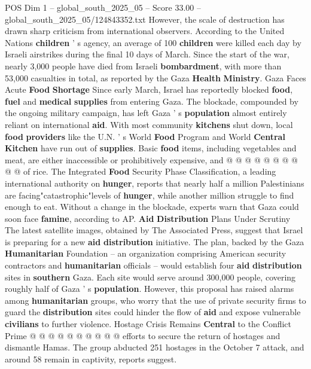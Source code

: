 \begin{textsample}{POS Dim 1 – global\_south\_2025\_05 – Score 33.00 – global\_south\_2025\_05/124843352.txt}
However, the scale of destruction has drawn sharp criticism from international observers.
According to the United Nations \textbf{children} ' s agency, an average of 100 \textbf{children} were killed each day by Israeli airstrikes during the final 10 days of March.
Since the start of the war, nearly 3,000 people have died from Israeli \textbf{bombardment}, with more than 53,000 casualties in total, as reported by the Gaza \textbf{Health} \textbf{Ministry}.
Gaza Faces Acute \textbf{Food} \textbf{Shortage} Since early March, Israel has reportedly blocked \textbf{food}, \textbf{fuel} and \textbf{medical} \textbf{supplies} from entering Gaza.
The blockade, compounded by the ongoing military campaign, has left Gaza ' s \textbf{population} almost entirely reliant on international \textbf{aid}.
With most community \textbf{kitchens} shut down, local \textbf{food} \textbf{providers} like the U.N. ' s World \textbf{Food} Program and World \textbf{Central} \textbf{Kitchen} have run out of \textbf{supplies}.
Basic \textbf{food} items, including vegetables and meat, are either inaccessible or prohibitively expensive, and @ @ @ @ @ @ @ @ @ @ of rice.
The Integrated \textbf{Food} Security Phase Classification, a leading international authority on \textbf{hunger}, reports that nearly half a million Palestinians are facing"catastrophic"levels of \textbf{hunger}, while another million struggle to find enough to eat.
Without a change in the blockade, experts warn that Gaza could soon face \textbf{famine}, according to AP. \textbf{Aid} \textbf{Distribution} Plans Under Scrutiny The latest satellite images, obtained by The Associated Press, suggest that Israel is preparing for a new \textbf{aid} \textbf{distribution} initiative.
The plan, backed by the Gaza \textbf{Humanitarian} Foundation -- an organization comprising American security contractors and \textbf{humanitarian} officials -- would establish four \textbf{aid} \textbf{distribution} sites in \textbf{southern} Gaza.
Each site would serve around 300,000 people, covering roughly half of Gaza ' s \textbf{population}.
However, this proposal has raised alarms among \textbf{humanitarian} groups, who worry that the use of private security firms to guard the \textbf{distribution} sites could hinder the flow of \textbf{aid} and expose vulnerable \textbf{civilians} to further violence.
Hostage Crisis Remains \textbf{Central} to the Conflict Prime @ @ @ @ @ @ @ @ @ @ efforts to secure the return of hostages and dismantle Hamas.
The group abducted 251 hostages in the October 7 attack, and around 58 remain in captivity, reports suggest.

\end{textsample}
